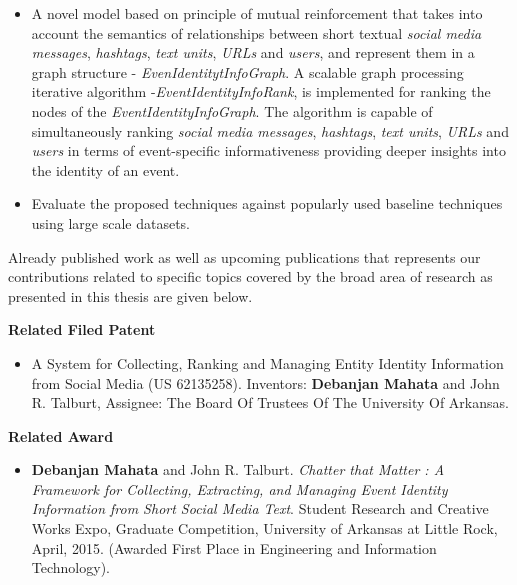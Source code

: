\documentclass[11pt, oneside]{Thesis} %
\begin{document}
\begin{itemize}
\item A novel model based on principle of mutual reinforcement that takes into account the semantics of relationships between short textual \textit{social media messages}, \textit{hashtags}, \textit{text units}, \textit{URLs} and \textit{users}, and represent them in a graph structure - \textit{EvenIdentitytInfoGraph}. A scalable graph processing iterative algorithm -\textit{EventIdentityInfoRank}, is implemented for ranking the nodes of the \textit{EventIdentityInfoGraph}. The algorithm is capable of simultaneously ranking \textit{social media messages}, \textit{hashtags}, \textit{text units}, \textit{URLs} and \textit{users} in terms of event-specific informativeness providing deeper insights into the identity of an event.

\item Evaluate the proposed techniques against popularly used baseline techniques using large scale datasets.

\end{itemize}

Already published work as well as upcoming publications that represents our contributions related to specific topics covered by the broad area of research as presented in this thesis are given below.

\textbf{\LARGE Related Filed Patent}
\begin{itemize}
\item A System for Collecting, Ranking and Managing Entity Identity Information from Social Media (US 62135258). Inventors: \textbf{Debanjan Mahata} and John R. Talburt, Assignee: The Board Of Trustees Of The University Of Arkansas.
\end{itemize}

\textbf{\LARGE Related Award}
\begin{itemize}
\item \textbf{Debanjan Mahata} and John R. Talburt. \textit{Chatter that Matter : A Framework for Collecting, Extracting, and Managing Event Identity Information from Short Social Media Text}. Student Research and Creative Works Expo, Graduate Competition, University of Arkansas at Little Rock, April, 2015. (Awarded First Place in Engineering and Information Technology).  
\end{itemize}
\end{document}

